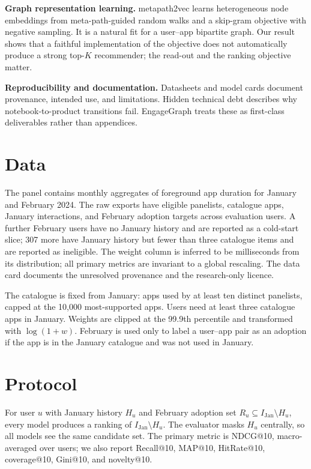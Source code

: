 \documentclass[11pt]{article}
\begin{document}
\textbf{Graph representation learning.} metapath2vec \citep{dong2017metapath2vec} learns heterogeneous node embeddings from meta-path-guided random walks and a skip-gram objective with negative sampling. It is a natural fit for a user--app bipartite graph. Our result shows that a faithful implementation of the objective does not automatically produce a strong top-$K$ recommender; the read-out and the ranking objective matter.

\textbf{Reproducibility and documentation.} Datasheets \citep{gebro2021datasheets} and model cards \citep{mitchell2019modelcards} document provenance, intended use, and limitations. Hidden technical debt \citep{sculley2015debt} describes why notebook-to-product transitions fail. EngageGraph treats these as first-class deliverables rather than appendices.

\section{Data}

The panel contains monthly aggregates of foreground app duration for January and February 2024. The raw exports have \DatasetUsers{} eligible panelists, \DatasetItems{} catalogue apps, \TrainInteractions{} January interactions, and \TestTargets{} February adoption targets across \EvalUsers{} evaluation users. A further \ColdUsers{} February users have no January history and are reported as a cold-start slice; 307 more have January history but fewer than three catalogue items and are reported as ineligible. The weight column is inferred to be milliseconds from its distribution; all primary metrics are invariant to a global rescaling. The data card documents the unresolved provenance and the research-only licence.

The catalogue is fixed from January: apps used by at least ten distinct panelists, capped at the 10{,}000 most-supported apps. Users need at least three catalogue apps in January. Weights are clipped at the 99.9th percentile and transformed with $\log(1+w)$. February is used only to label a user--app pair as an adoption if the app is in the January catalogue and was not used in January.

\section{Protocol}

For user $u$ with January history $H_u$ and February adoption set $R_u \subseteq I_{\mathrm{Jan}} \setminus H_u$, every model produces a ranking of $I_{\mathrm{Jan}} \setminus H_u$. The evaluator masks $H_u$ centrally, so all models see the same candidate set. The primary metric is NDCG@10, macro-averaged over users; we also report Recall@10, MAP@10, HitRate@10, coverage@10, Gini@10, and novelty@10.
\end{document}
